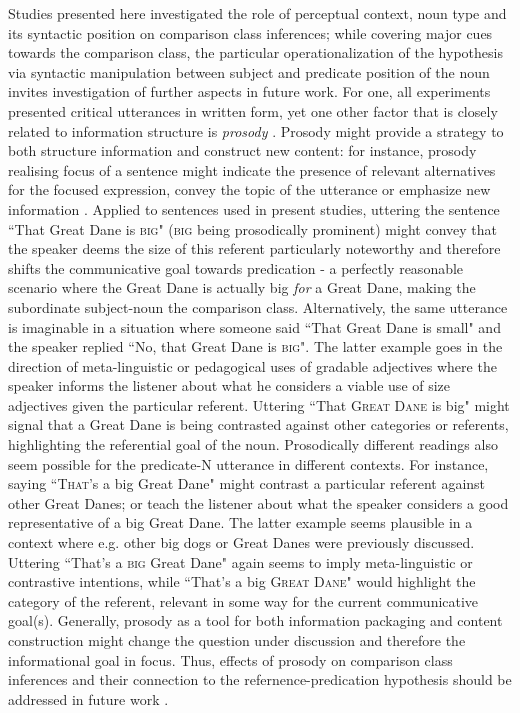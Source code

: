 Studies presented here investigated the role of perceptual context, noun type and its syntactic position on comparison class inferences; while covering major cues towards the comparison class, the particular operationalization of the hypothesis via syntactic manipulation between subject and predicate position of the noun invites investigation of further aspects in future work. For one, all experiments presented critical utterances in written form, yet one other factor that is closely related to information structure is \emph{prosody} \parencite{krifka2008basic}. Prosody might provide a strategy to both structure information and construct new content: for instance, prosody realising focus of a sentence might indicate the presence of relevant alternatives for the focused expression, convey the topic of the utterance or emphasize new information \parencite{krifka2008basic, selkirk1995sentence}. 
Applied to sentences used in present studies, uttering the sentence ``That Great Dane is \textsc{big}" (\textsc{big} being prosodically prominent) might convey that the speaker deems the size of this referent particularly noteworthy and therefore shifts the communicative goal towards predication - a perfectly reasonable scenario where the Great Dane is actually big \emph{for} a Great Dane, making the subordinate subject-noun the comparison class.  Alternatively, the same utterance is imaginable in a situation where someone said ``That Great Dane is small" and the speaker replied ``No, that Great Dane is \textsc{big}". The latter example goes in the direction of meta-linguistic or pedagogical uses of gradable adjectives where the speaker informs the listener about what he considers a viable use of size adjectives given the particular referent. Uttering ``That \textsc{Great Dane} is big" might signal that a Great Dane is being contrasted against other categories or referents, highlighting the referential goal of the noun.
Prosodically different readings also seem possible for the predicate-N utterance in different contexts. For instance, saying ``\textsc{That}'s a big Great Dane" might contrast a particular referent against other Great Danes; or teach the listener about what the speaker considers a good representative of a big Great Dane. The latter example seems plausible in a context where e.g. other big dogs or Great Danes were previously discussed. Uttering ``That's a \textsc{big} Great Dane" again seems to imply meta-linguistic or contrastive intentions, while ``That's a big \textsc{Great Dane}" would highlight the category of the referent, relevant in some way for the current communicative goal(s). 
Generally, prosody as a tool for both information packaging and content construction might change the question under discussion and therefore the informational goal in focus. Thus, effects of prosody on comparison class inferences and their connection to the refernence-predication hypothesis should be addressed in future work \parencite[cf.][]{krifka2008basic}. 

